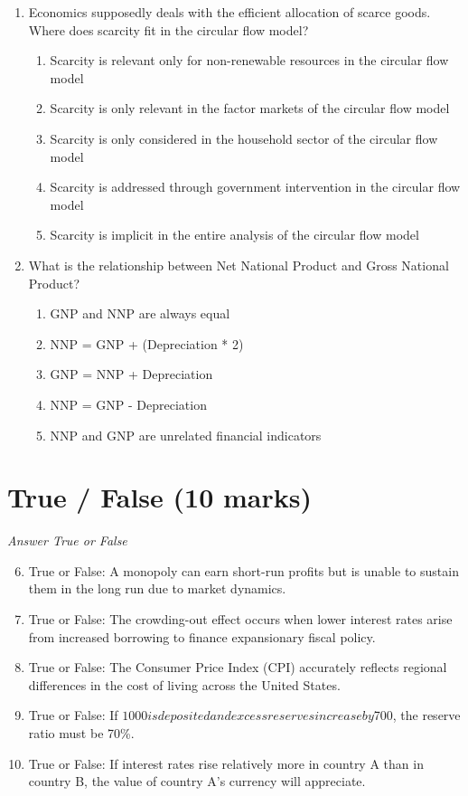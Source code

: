 \documentclass[12pt]{article}
\begin{document}
\begin{enumerate}[label=\arabic*.]
\begin{enumerate}[label=(\alph*)]
    \item A trade agreement between Europe and Asia to promote intercontinental commerce
\end{enumerate}
\item Economics supposedly deals with the efficient allocation of scarce goods. Where does scarcity fit in the circular flow model?
\begin{enumerate}[label=(\alph*)]
    \item Scarcity is relevant only for non-renewable resources in the circular flow model
    \item Scarcity is only relevant in the factor markets of the circular flow model
    \item Scarcity is only considered in the household sector of the circular flow model
    \item Scarcity is addressed through government intervention in the circular flow model
    \item Scarcity is implicit in the entire analysis of the circular flow model
\end{enumerate}
\item What is the relationship between Net National Product and Gross National Product?
\begin{enumerate}[label=(\alph*)]
    \item GNP and NNP are always equal
    \item NNP = GNP + (Depreciation * 2)
    \item GNP = NNP + Depreciation
    \item NNP = GNP - Depreciation
    \item NNP and GNP are unrelated financial indicators
\end{enumerate}
\end{enumerate}

\section*{True / False (10 marks)}
\textit{Answer True or False}
\begin{enumerate}[label=\arabic*.]
\setcounter{enumi}{5}
\item True or False: A monopoly can earn short-run profits but is unable to sustain them in the long run due to market dynamics.
\item True or False: The crowding-out effect occurs when lower interest rates arise from increased borrowing to finance expansionary fiscal policy.
\item True or False: The Consumer Price Index (CPI) accurately reflects regional differences in the cost of living across the United States.
\item True or False: If $1000 is deposited and excess reserves increase by $700, the reserve ratio must be 70\%.
\item True or False: If interest rates rise relatively more in country A than in country B, the value of country A's currency will appreciate.
\end{enumerate}
\end{document}
